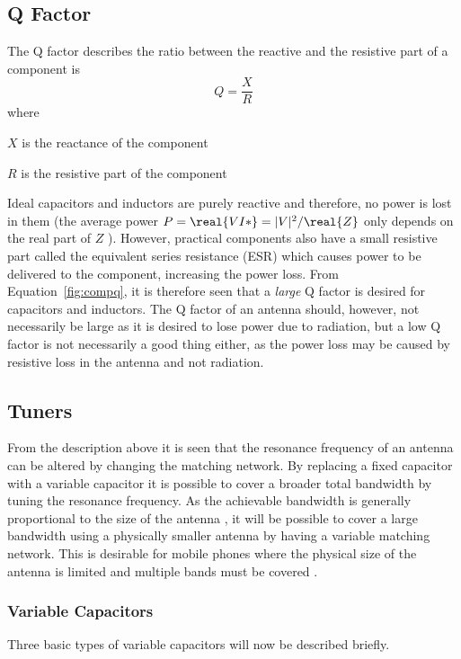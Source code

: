 \subsection{Q Factor}
The Q factor describes the ratio between the reactive and the resistive part of a component is \cite{pozar2011microwave}
\begin{equation}
    \label{fig:compq}
    Q = \frac{X}{R}
\end{equation}
where
\begin{where}
\item[$X$] is the reactance of the component
\item[$R$] is the resistive part of the component
\end{where}
Ideal capacitors and inductors are purely reactive and therefore, no power is lost in them (the average power $P = \real{VI*} = |V|^2 / \real{Z}$ only depends on the real part of $Z$ \cite{irwin2011engineering}). However, practical components also have a small resistive part called the equivalent series resistance (ESR) which causes power to be delivered to the component, increasing the power loss. From Equation~\ref{fig:compq}, it is therefore seen that a \emph{large} Q factor is desired for capacitors and inductors. The Q factor of an antenna should, however, not necessarily be large as it is desired to lose power due to radiation, but a low Q factor is not necessarily a good thing either, as the power loss may be caused by resistive loss in the antenna and not radiation.

\subsection{Tuners}
From the description above it is seen that the resonance frequency of an antenna can be altered by changing the matching network. By replacing a fixed capacitor with a variable capacitor it is possible to cover a broader total bandwidth by tuning the resonance frequency. As the achievable bandwidth is generally proportional to the size of the antenna , it will be possible to cover a large bandwidth using a physically smaller antenna by having a variable matching network. This is desirable for mobile phones where the physical size of the antenna is limited and multiple bands must be covered \cite{gu2014rf}.

\subsubsection{Variable Capacitors}
Three basic types of variable capacitors will now be described briefly. 

